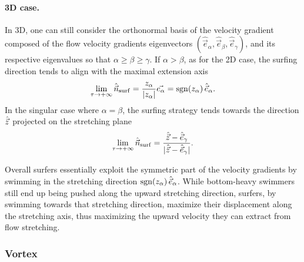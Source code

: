 \paragraph{3D case.}
In 3D, one can still consider the orthonormal basis of the velocity gradient composed of the flow velocity gradients eigenvectors $(\hat{\vec{e}}_{\alpha}, \hat{\vec{e}}_{\beta}, \hat{\vec{e}}_{\gamma})$, and its respective eigenvalues so that $\alpha \ge \beta \ge \gamma$.
If $\alpha > \beta$, as for the 2D case, the surfing direction tends to align with the maximal extension axis
\begin{equation}
	\label{eq:optimal_swimming_direction_sym_lim}
	\lim_{\tau \to +\infty} \hat{\vec{n}}_{\mathrm{surf}} = \frac{z_{\alpha}}{\lvert z_{\alpha}\rvert} \vec{e_{\alpha}} = \operatorname{sgn}(z_{\alpha}) \, \hat{\vec{e}}_{\alpha}.
\end{equation}
In the singular case where $\alpha = \beta$, the surfing strategy tends towards the direction $\hat{\vec{z}}$ projected on the stretching plane
\begin{equation}
	\label{eq:optimal_swimming_direction_sym_lim_3D}
	\lim_{\tau \to +\infty} \hat{\vec{n}}_{\mathrm{surf}} = \frac{\hat{\vec{z}} - \hat{\vec{e}}_{\gamma}}{\lvert\hat{\vec{z}} - \hat{\vec{e}}_{\gamma}\rvert}.
\end{equation}

Overall surfers essentially exploit the symmetric part of the velocity gradients by swimming in the stretching direction $\operatorname{sgn}(z_{\alpha}) \, \hat{\vec{e}}_{\alpha}$.
While bottom-heavy swimmers still end up being pushed along the upward stretching direction, surfers, by swimming towards that stretching direction, maximize their displacement along the stretching axis, thus maximizing the upward velocity they can extract from flow stretching. 

\subsubsection{Vortex}\label{sec:the_surfing_strategy_linear_skew_sym}

